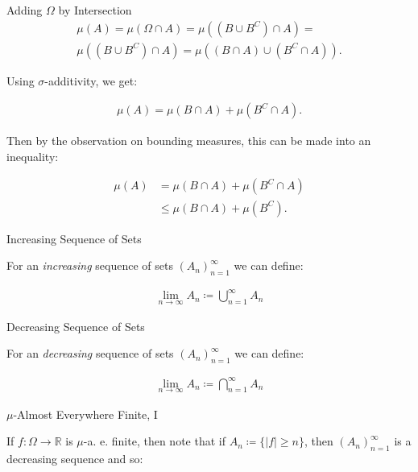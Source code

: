 \documentclass[10pt,landscape]{article}
\renewcommand{\leq}{\leqslant}
\renewcommand{\geq}{\geqslant}
\begin{document}
\begin{multicols}{3}
\begin{observation}{}{Adding $\Omega$ by Intersection}
        \begin{align*}
            \mu(A) = \mu(\Omega \cap A) = \mu((B \cup B^C) \cap A) = \\
            \mu((B \cup B^C) \cap A) = \mu((B \cap A) \cup (B^C \cap A)).
        \end{align*}

    Using $\sigma$-additivity, we get:

        \begin{align*}
            \mu(A) = \mu(B \cap A) + \mu(B^C \cap A).
        \end{align*}

    Then by the observation on bounding measures, this can be made into an inequality:

        \begin{align*}
            \mu(A) &= \mu(B \cap A) + \mu(B^C \cap A) \\
            &\leq \mu(B \cap A) + \mu(B^C).
        \end{align*}

\end{observation}

\begin{observation}{}{Increasing Sequence of Sets}

    For an \emph{increasing} sequence of sets $(A_n)_{n=1}^{\infty}$ we can define:

        \begin{align*}
            \lim_{n \to \infty} A_n \coloneqq \bigcup_{n=1}^{\infty} A_n
        \end{align*}

\end{observation}

\begin{observation}{}{Decreasing Sequence of Sets}

    For an \emph{decreasing} sequence of sets $(A_n)_{n=1}^{\infty}$ we can define:

        \begin{align*}
            \lim_{n \to \infty} A_n \coloneqq \bigcap_{n=1}^{\infty} A_n
        \end{align*}

\end{observation}

\begin{observation}{}{$\mu$-Almost Everywhere Finite, I}

    If $f: \Omega \to \mathbb{R}$ is $\mu$-a. e. finite, then note that if $A_n \coloneqq \{ |f| \geq n \}$, then $(A_n)_{n=1}^{\infty}$ is a decreasing sequence and so:


\end{observation}
\end{multicols}
\end{document}
